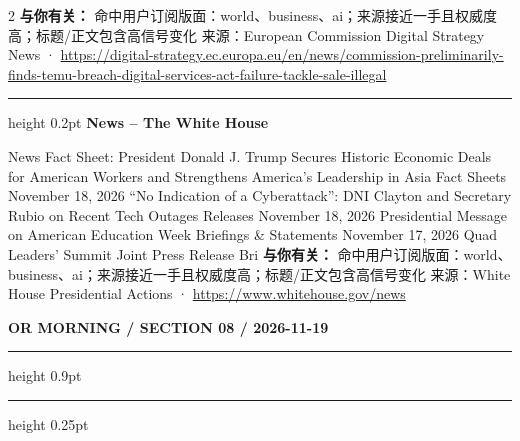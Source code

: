 \documentclass[10.5pt]{ctexart}
\begin{document}
\begin{multicols}{2}
\textbf{与你有关：} 命中用户订阅版面：world、business、ai；来源接近一手且权威度高；标题/正文包含高信号变化
{\footnotesize\color{ormuted} 来源：European Commission Digital Strategy News · \url{https://digital-strategy.ec.europa.eu/en/news/commission-preliminarily-finds-temu-breach-digital-services-act-failure-tackle-sale-illegal}}
\vspace{2mm}
\hrule height 0.2pt
\vspace{2mm}
{\large\bfseries News – The White House}\par
News Fact Sheet: President Donald J. Trump Secures Historic Economic Deals for American Workers and Strengthens America’s Leadership in Asia Fact Sheets November 18, 2026 “No Indication of a Cyberattack”: DNI Clayton and Secretary Rubio on Recent Tech Outages Releases November 18, 2026 Presidential Message on American Education Week Briefings \& Statements November 17, 2026 Quad Leaders’ Summit Joint Press Release Bri
\textbf{与你有关：} 命中用户订阅版面：world、business、ai；来源接近一手且权威度高；标题/正文包含高信号变化
{\footnotesize\color{ormuted} 来源：White House Presidential Actions · \url{https://www.whitehouse.gov/news}}
\end{multicols}
\newpage
{\small\bfseries OR MORNING / SECTION 08 / 2026-11-19}
\vspace{2mm}
\hrule height 0.9pt
\vspace{1.5mm}
\hrule height 0.25pt
\vspace{4mm}
\end{document}

